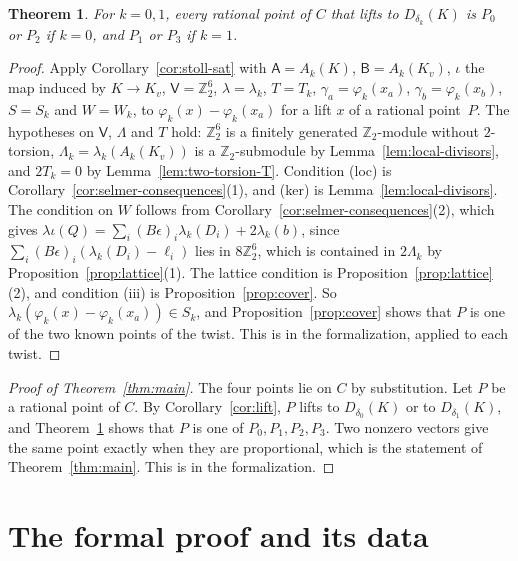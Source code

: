 \documentclass[11pt]{amsart}
\newtheorem{theorem}{Theorem}[section]
\theoremstyle{definition}
\numberwithin{equation}{section}
\newcommand{\Zt}{\mathbb{Z}_2}
\newcommand{\kv}{K_v}
\newcommand{\lean}[1]{\ignorespaces}
\begin{document}
\begin{theorem}\label{thm:twist}\lean{FurioLombardo.M3a.Route.twistConclusion_of_inputs}
For $k=0,1$, every rational point of $C$ that lifts to $D_{\delta_k}(K)$ is $P_0$ or $P_2$ if $k=0$, and $P_1$ or $P_3$ if $k=1$.
\end{theorem}

\begin{proof}
Apply Corollary~\ref{cor:stoll-sat} with $\mathsf A=A_k(K)$, $\mathsf B=A_k(\kv)$, $\iota$ the map induced by $K\to\kv$, $\mathsf V=\Zt^6$, $\lambda=\lambda_k$, $T=T_k$, $\gamma_a=\varphi_k(x_a)$, $\gamma_b=\varphi_k(x_b)$, $S=S_k$ and $W=W_k$, to $\varphi_k(x)-\varphi_k(x_a)$ for a lift $x$ of a rational point~$P$. The hypotheses on $\mathsf V$, $\Lambda$ and $T$ hold: $\Zt^6$ is a finitely generated $\Zt$-module without $2$-torsion, $\Lambda_k=\lambda_k(A_k(\kv))$ is a $\Zt$-submodule by Lemma~\ref{lem:local-divisors}, and $2T_k=0$ by Lemma~\ref{lem:two-torsion-T}. Condition (loc) is Corollary~\ref{cor:selmer-consequences}(1), and (ker) is Lemma~\ref{lem:local-divisors}. The condition on $W$ follows from Corollary~\ref{cor:selmer-consequences}(2), which gives $\lambda\iota(Q)=\sum_i(B\epsilon)_i\lambda_k(D_i)+2\lambda_k(b)$, since $\sum_i(B\epsilon)_i(\lambda_k(D_i)-\ell_i)$ lies in $8\Zt^6$, which is contained in $2\Lambda_k$ by Proposition~\ref{prop:lattice}(1). The lattice condition is Proposition~\ref{prop:lattice}(2), and condition (iii) is Proposition~\ref{prop:cover}. So $\lambda_k(\varphi_k(x)-\varphi_k(x_a))\in S_k$, and Proposition~\ref{prop:cover} shows that $P$ is one of the two known points of the twist. This is  in the formalization, applied to each twist.
\end{proof}

\begin{proof}[Proof of Theorem~\ref{thm:main}]
The four points lie on $C$ by substitution. Let $P$ be a rational point of $C$. By Corollary~\ref{cor:lift}, $P$ lifts to $D_{\delta_0}(K)$ or to $D_{\delta_1}(K)$, and Theorem~\ref{thm:twist} shows that $P$ is one of $P_0,P_1,P_2,P_3$. Two nonzero vectors give the same point exactly when they are proportional, which is the statement of Theorem~\ref{thm:main}. This is  in the formalization.
\end{proof}

\section{The formal proof and its data}
\label{sec:comp}
\end{document}

